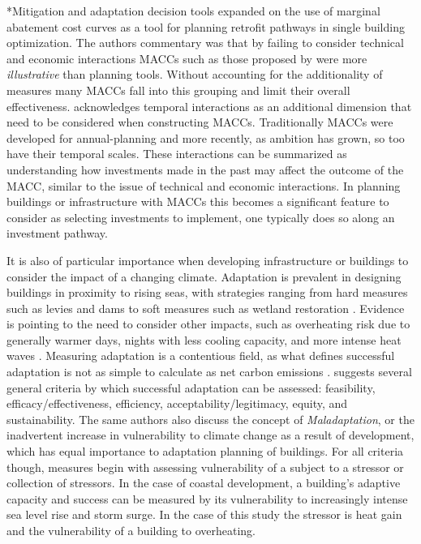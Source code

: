 \documentclass[twocolumn, a4paper,10pt]{article}
\makeatletter
\renewcommand\subsection{\@startsection{subsection}{1}{\z@}{\z@}{\z@}{\normalfont\normalsize\bfseries}}
\renewcommand\subsection{\@startsection{subsection}{1}{\z@}{\z@}{0.1pt}{\normalfont\normalsize\bfseries}}
\makeatother
\begin{document}
\subsection*{Mitigation and adaptation decision tools}
\citet{rysanek_using_2013} expanded on the use of marginal abatement cost curves as a tool for planning retrofit pathways in single building optimization. The authors commentary was that by failing to consider technical and economic interactions MACCs such as those proposed by \citet{mckinsey__co_climate_2010} were more \textit{illustrative} than planning tools. Without accounting for the additionality of measures many MACCs fall into this grouping and limit their overall effectiveness. \citet{kesicki_marginal_2012} acknowledges temporal interactions as an additional dimension that need to be considered when constructing MACCs. Traditionally MACCs were developed for annual-planning and more recently, as ambition has grown, so too have their temporal scales. These interactions can be summarized as understanding how investments made in the past may affect the outcome of the MACC, similar to the issue of technical and economic interactions. In planning buildings or infrastructure with MACCs this becomes a significant feature to consider as selecting investments to implement, one typically does so along an investment pathway. 

It is also of particular importance when developing infrastructure or buildings to consider the impact of a changing climate. Adaptation is prevalent in designing buildings in proximity to rising seas, with strategies ranging from hard measures such as levies and dams to soft measures such as wetland restoration \citep{pachauri_climate_2015}. Evidence is pointing to the need to consider other impacts, such as overheating risk due to generally warmer days, nights with less cooling capacity, and more intense heat waves \citep{lomas_overheating_2017,rysanek_forecasting_2021}. Measuring adaptation is a contentious field, as what defines successful adaptation is not as simple to calculate as net carbon emissions \citep{pachauri_climate_2015}. \citet{brooks_tracking_2011} suggests several general criteria by which successful adaptation can be assessed: feasibility, efficacy/effectiveness, efficiency, acceptability/legitimacy, equity, and sustainability. The same authors also discuss the concept of \textit{Maladaptation}, or the inadvertent increase in vulnerability to climate change as a result of development, which has equal importance to adaptation planning of buildings. For all criteria though, measures begin with assessing vulnerability of a subject to a stressor or collection of stressors. In the case of coastal development, a building's adaptive capacity and success can be measured by its vulnerability to increasingly intense sea level rise and storm surge. In the case of this study the stressor is heat gain and the vulnerability of a building to overheating. 
\end{document}
